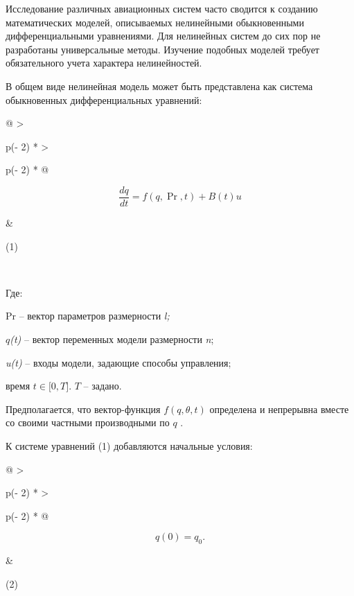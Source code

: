 Исследование различных авиационных систем часто сводится к созданию
математических моделей, описываемых нелинейными обыкновенными
дифференциальными уравнениями. Для нелинейных систем до сих пор не
разработаны универсальные методы. Изучение подобных моделей требует
обязательного учета характера нелинейностей.

В общем виде нелинейная модель может быть представлена как система
обыкновенных дифференциальных уравнений:

\begin{longtable}[]{@{}
  >{\raggedright\arraybackslash}p{(\columnwidth - 2\tabcolsep) * }
  >{\raggedright\arraybackslash}p{(\columnwidth - 2\tabcolsep) * }@{}}
\toprule\noalign{}
\begin{minipage}[b]{\linewidth}\raggedright
\[\frac{dq}{dt} = f\left( q,\Pr,t \right) + B(t)u\]
\end{minipage} & \begin{minipage}[b]{\linewidth}\raggedright
(1)
\end{minipage} \\
\midrule\noalign{}
\endhead
\bottomrule\noalign{}
\endlastfoot
\end{longtable}

Где:

Pr -- вектор параметров размерности \emph{l;}

\(q\)\emph{(t)} -- вектор переменных модели размерности \emph{n};

\emph{u(t)} -- входы модели, задающие способы управления;

время \(t \in \lbrack 0,T\rbrack\). \(T\) -- задано.

Предполагается, что вектор-функция \(f(q,\theta,t)\) определена и
непрерывна вместе со своими частными производными по \(q\) .

К системе уравнений (1) добавляются начальные условия:

\begin{longtable}[]{@{}
  >{\raggedright\arraybackslash}p{(\columnwidth - 2\tabcolsep) * }
  >{\raggedright\arraybackslash}p{(\columnwidth - 2\tabcolsep) * }@{}}
\toprule\noalign{}
\begin{minipage}[b]{\linewidth}\raggedright
\[q(0) = q_{0}.\]
\end{minipage} & \begin{minipage}[b]{\linewidth}\raggedright
(2)
\end{minipage} \\
\midrule\noalign{}
\endhead
\bottomrule\noalign{}
\endlastfoot
\end{longtable}


